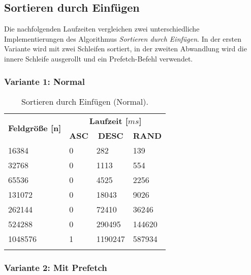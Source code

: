 \subsection{Sortieren durch Einfügen}

Die nachfolgenden Laufzeiten vergleichen zwei unterschiedliche Implementierungen des Algorithmus \textit{Sortieren durch Einfügen}. In der ersten Variante wird mit zwei Schleifen sortiert, in der zweiten Abwandlung wird die innere Schleife ausgerollt und ein Prefetch-Befehl verwendet.

\subsubsection{Variante 1: Normal}

\begin{center}
	\begin{longtable}{|p{5cm}|p{3cm}|p{3cm}|p{3cm}|}
		\hline
		
		\multirow{2}{5cm}{\centering \textbf{Feldgröße [n]}} & \multicolumn{3}{|c|}{ \textbf{Laufzeit [$ms$]}} \\\cline{2-4}
		& \multicolumn{1}{|c|}{\textbf{ASC}} & \multicolumn{1}{|c|}{\textbf{DESC}} &\multicolumn{1}{|c|}{\textbf{RAND}} \\
		\hhline{|=|=|=|=|}
		
		16384 & 0 & 282 & 139\\
		\hline
		32768 & 0 & 1113 & 554\\
		\hline
		65536 & 0 & 4525 & 2256\\
		\hline
		131072 & 0 & 18043 & 9026\\
		\hline
		262144 & 0 & 72410 & 36246\\
		\hline
		524288 & 0 & 290495 & 144620\\
		\hline
		1048576 & 1 & 1190247 & 587934\\
		\hline
		
		\caption{Sortieren durch Einfügen (Normal).}
		\label{tab:insertionsort-v1}
	\end{longtable}
\end{center}

\subsubsection{Variante 2: Mit Prefetch}

